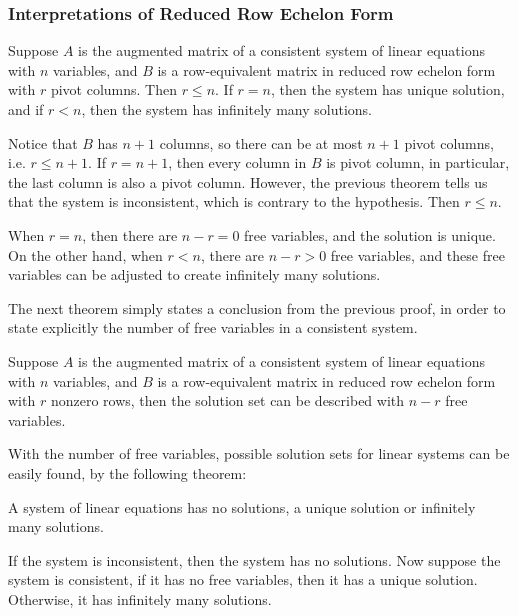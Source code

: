\documentclass[a4paper,12pt]{article}
\begin{document}
\subsubsection{Interpretations of Reduced Row Echelon Form}
\begin{thm}
  Suppose $A$ is the augmented matrix of a consistent system of linear equations with $n$ variables, and $B$ is a row-equivalent matrix in reduced row echelon form with $r$ pivot columns. Then $r\leq n$. If $r=n$, then the system has unique solution, and if $r<n$, then the system has infinitely many solutions.\n

  \prf Notice that $B$ has $n+1$ columns, so there can be at most $n+1$ pivot columns, i.e. $r\leq n+1$. If $r=n+1$, then every column in $B$ is pivot column, in particular, the last column is also a pivot column. However, the previous theorem tells us that the system is inconsistent, which is contrary to the hypothesis. Then $r\leq n$.\n

  When $r=n$, then there are $n-r=0$ free variables, and the solution is unique. On the other hand, when $r<n$, there are $n-r>0$ free variables, and these free variables can be adjusted to create infinitely many solutions.
\end{thm}\n

The next theorem simply states a conclusion from the previous proof, in order to state explicitly the number of free variables in a consistent system.\n

\begin{thm}
  Suppose $A$ is the augmented matrix of a consistent system of linear equations with $n$ variables, and $B$ is a row-equivalent matrix in reduced row echelon form with $r$ nonzero rows, then the solution set can be described with $n-r$ free variables.
\end{thm}\n

With the number of free variables, possible solution sets for linear systems can be easily found, by the following theorem:\n

\begin{thm}
  A system of linear equations has no solutions, a unique solution or infinitely many solutions.\n

  \prf If the system is inconsistent, then the system has no solutions. Now suppose the system is consistent, if it has no free variables, then it has a unique solution. Otherwise, it has infinitely many solutions.
\end{thm}
\end{document}
